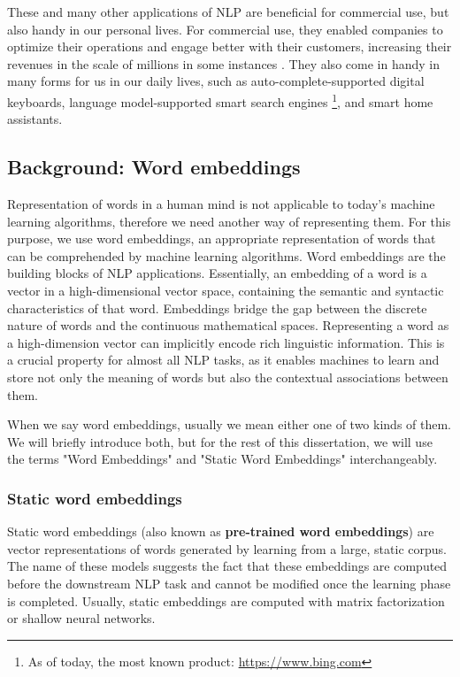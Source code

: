 These and many other applications of \ac{NLP} are beneficial for commercial use, but also handy in our personal lives. For commercial use, they enabled companies to optimize their operations and engage better with their customers, increasing their revenues in the scale of millions in some instances \cite{comm-nlp}. They also come in handy in many forms for us in our daily lives, such as auto-complete-supported digital keyboards, language model-supported smart search engines \footnote{As of today, the most known product: \url{https://www.bing.com}}, and smart home assistants.


\subsection{Background: Word embeddings}

Representation of words in a human mind is not applicable to today's machine learning algorithms, therefore we need another way of representing them. For this purpose, we use word embeddings, an appropriate representation of words that can be comprehended by machine learning algorithms. Word embeddings are the building blocks of \ac{NLP} applications. Essentially, an embedding of a word is a vector in a high-dimensional vector space, containing the semantic and syntactic characteristics of that word. Embeddings bridge the gap between the discrete nature of words and the continuous mathematical spaces. Representing a word as a high-dimension vector can implicitly encode rich linguistic information. This is a crucial property for almost all \ac{NLP} tasks, as it enables machines to learn and store not only the meaning of words but also the contextual associations between them. 

When we say word embeddings, usually we mean either one of two kinds of them. We will briefly introduce both, but for the rest of this dissertation, we will use the terms "Word Embeddings" and "Static Word Embeddings" interchangeably. 

\subsubsection{Static word embeddings}

Static word embeddings (also known as \textbf{pre-trained word embeddings}) are vector representations of words generated by learning from a large, static corpus. The name of these models suggests the fact that these embeddings are computed before the downstream \ac{NLP} task and cannot be modified once the learning phase is completed. Usually, static embeddings are computed with matrix factorization or shallow neural networks.

